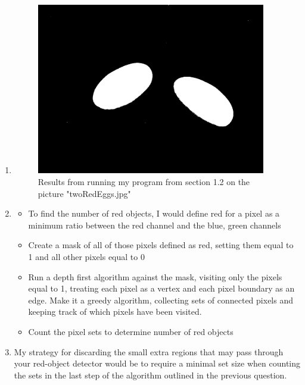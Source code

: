 \documentclass{article}
\begin{document}
\begin{enumerate}
\pagebreak
\item
\begin{figure}[ht!]
\centering
\includegraphics[width=100mm]{twoRedEggsThresholded175.png}
\caption{Results from running my program from section 1.2 on the picture "twoRedEggs.jpg"}
\label{overflow}
\end{figure}

\item
\begin{itemize}
\item
To find the number of red objects, I would define red for a pixel as a minimum ratio between the red channel and the blue, green channels
\item
Create a mask of all of those pixels defined as red, setting them equal to 1 and all other pixels equal to 0
\item
Run a depth first algorithm against the mask, visiting only the pixels equal to 1, treating each pixel as a vertex and each pixel boundary as an edge. Make it a greedy algorithm, collecting sets of connected pixels and keeping track of which pixels have been visited.
\item
Count the pixel sets to determine number of red objects
\end{itemize}
\item
My strategy for discarding the small extra regions that may pass through your red-object detector would be to require a minimal set size when counting the sets in the last step of the algorithm outlined in the previous question.


\end{enumerate}
\end{document}
